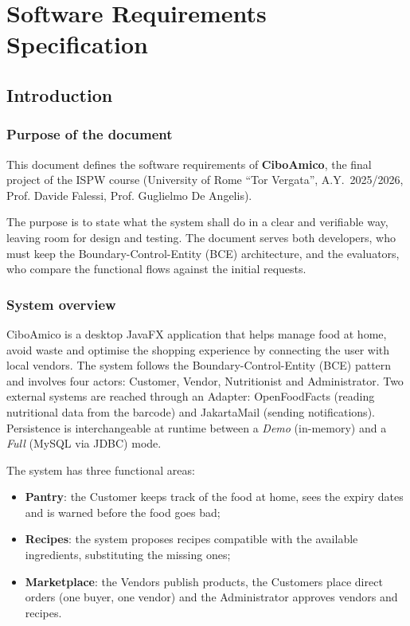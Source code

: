 \chapter{Software Requirements Specification}
\label{cap:srs}

\section{Introduction}
\label{sec:intro}

\subsection{Purpose of the document}
\label{subsec:scopo}

This document defines the software requirements of \textbf{CiboAmico}, the final project of the ISPW course (University of Rome ``Tor Vergata'', A.Y.\ 2025/2026, Prof. Davide Falessi, Prof. Guglielmo De Angelis).

The purpose is to state what the system shall do in a clear and verifiable way, leaving room for design and testing. The document serves both developers, who must keep the Boundary-Control-Entity (BCE) architecture, and the evaluators, who compare the functional flows against the initial requests.

\subsection{System overview}
\label{subsec:panoramica}

CiboAmico is a desktop JavaFX application that helps manage food at home, avoid waste and optimise the shopping experience by connecting the user with local vendors. The system follows the Boundary-Control-Entity (BCE) pattern and involves four actors: Customer, Vendor, Nutritionist and Administrator. Two external systems are reached through an Adapter: OpenFoodFacts (reading nutritional data from the barcode) and JakartaMail (sending notifications). Persistence is interchangeable at runtime between a \textit{Demo} (in-memory) and a \textit{Full} (MySQL via JDBC) mode.

The system has three functional areas:
\begin{itemize}
    \item \textbf{Pantry}: the Customer keeps track of the food at home, sees the expiry dates and is warned before the food goes bad;
    \item \textbf{Recipes}: the system proposes recipes compatible with the available ingredients, substituting the missing ones;
    \item \textbf{Marketplace}: the Vendors publish products, the Customers place direct orders (one buyer, one vendor) and the Administrator approves vendors and recipes.
\end{itemize}


